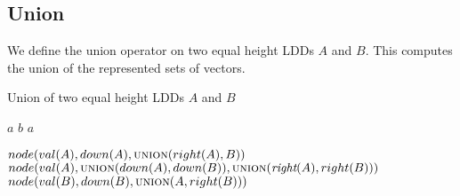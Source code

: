 \documentclass{article}
\newcommand{\var}[1]{\ensuremath{\textit{#1}}}
\begin{document}
\subsection{Union}

We define the union operator on two equal height LDDs $A$ and $B$.
This computes the union of the represented sets of vectors.

\begin{algorithm}[h]
\caption{Union of two equal height LDDs $\var{A}$ and $\var{B}$}
\begin{algorithmic}[1]
	\State \Return $a$
	\State \Return $b$
	\State \Return $a$
\EndIf

	\State \Return $node(val(A), down(A), \textsc{union}(right(A), B))$
	\State \Return $node(val(A), \textsc{union}(down(A), down(B)), \textsc{union}(\textit{right}(A), right(B)))$
	\State \Return $node(val(B), down(B), \textsc{union}(A, right(B)))$	
\EndIf

\EndFunction
\end{algorithmic}
\end{algorithm}
\end{document}
